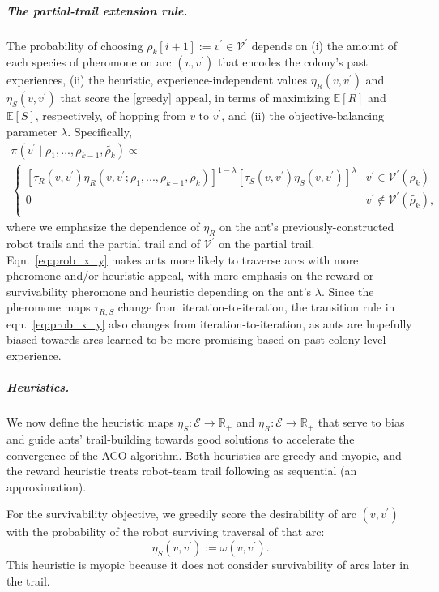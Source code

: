 \documentclass[11pt, oneside]{article}
\begin{document}
\subparagraph{The partial-trail extension rule.}
The probability of choosing $\rho_k[i+1]:=v^\prime \in  \mathcal{V}^\prime$ depends on (i) the amount of each species of pheromone on arc $(v, v^\prime)$ that encodes the colony's past experiences, (ii) the heuristic, experience-independent values $\eta_R(v, v^\prime)$ and $\eta_S(v, v^\prime)$ that score the [greedy] appeal, in terms of maximizing $\mathbb{E}[R]$ and $\mathbb{E}[S]$, respectively, of hopping from $v$ to $v^\prime$, and (ii) the objective-balancing parameter $\lambda$. Specifically,
\begin{multline}
	\pi(v^\prime \mid \rho_1, ..., \rho_{k-1}, \tilde{\rho_k}) \propto \\
		\begin{cases}
		 \left[\tau_R(v, v^\prime) \eta_R(v, v^\prime; \rho_1, ..., \rho_{k-1},\tilde{\rho_k}) \right]^{1-\lambda} \left[ \tau_S(v, v^\prime) \eta_S(v, v^\prime) \right]^\lambda & v^\prime \in \mathcal{V}^\prime (\tilde{\rho_k}) \\
		 0 & v^\prime \notin \mathcal{V}^\prime (\tilde{\rho_k}), \\
		 \end{cases}
	 \label{eq:prob_x_y}
\end{multline}
where we emphasize the dependence of $\eta_R$ on the ant's previously-constructed robot trails and the partial trail and of $\mathcal{V}^\prime$ on the partial trail.
Eqn.~\ref{eq:prob_x_y} makes ants more likely to traverse arcs with more pheromone and/or heuristic appeal, with more emphasis on the reward or survivability pheromone and heuristic depending on the ant's $\lambda$. Since the pheromone maps $\tau_{R,S}$ change from iteration-to-iteration, the transition rule in eqn.~\ref{eq:prob_x_y} also changes from iteration-to-iteration, as ants are hopefully biased towards arcs learned to be more promising based on past colony-level experience.

\subparagraph{Heuristics.} We now define the heuristic maps $\eta_S: \mathcal{E} \rightarrow \mathbb{R}_+$ and $\eta_R:  \mathcal{E} \rightarrow \mathbb{R}_+$ that serve to bias and guide ants' trail-building towards good solutions to accelerate the convergence of the ACO algorithm. Both heuristics are greedy and myopic, and the reward heuristic treats robot-team trail following as sequential (an approximation).   

For the survivability objective, we greedily score the desirability of arc $(v, v^\prime)$ with the probability of the robot surviving traversal of that arc:
\begin{equation}
	\eta_S(v, v^\prime):=\omega(v, v^\prime).
\end{equation}
This heuristic is myopic because it does not consider survivability of arcs later in the trail. 
\end{document}
